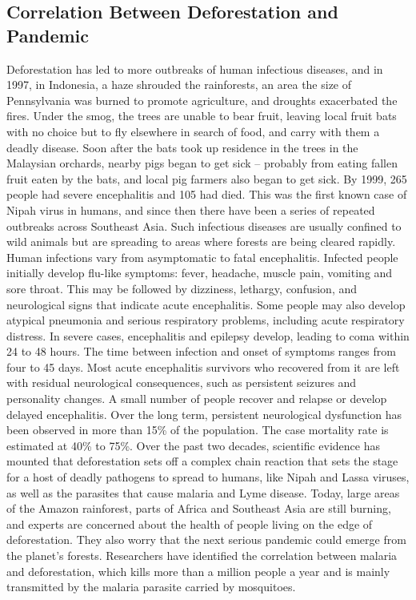 \documentclass{book}\usepackage{knitr}
\begin{document}
\begin{knitrout}
\begin{kframe}
\section{Correlation Between Deforestation and Pandemic}
Deforestation has led to more outbreaks of human infectious diseases, and in 1997, in Indonesia, a haze shrouded the rainforests, an area the size of Pennsylvania was burned to promote agriculture, and droughts exacerbated the fires. Under the smog, the trees are unable to bear fruit, leaving local fruit bats with no choice but to fly elsewhere in search of food, and carry with them a deadly disease. Soon after the bats took up residence in the trees in the Malaysian orchards, nearby pigs began to get sick -- probably from eating fallen fruit eaten by the bats, and local pig farmers also began to get sick. By 1999, 265 people had severe encephalitis and 105 had died. This was the first known case of Nipah virus in humans, and since then there have been a series of repeated outbreaks across Southeast Asia. Such infectious diseases are usually confined to wild animals but are spreading to areas where forests are being cleared rapidly. Human infections vary from asymptomatic to fatal encephalitis. Infected people initially develop flu-like symptoms: fever, headache, muscle pain, vomiting and sore throat. This may be followed by dizziness, lethargy, confusion, and neurological signs that indicate acute encephalitis. Some people may also develop atypical pneumonia and serious respiratory problems, including acute respiratory distress. In severe cases, encephalitis and epilepsy develop, leading to coma within 24 to 48 hours. The time between infection and onset of symptoms ranges from four to 45 days. Most acute encephalitis survivors who recovered from it are left with residual neurological consequences, such as persistent seizures and personality changes. A small number of people recover and relapse or develop delayed encephalitis. Over the long term, persistent neurological dysfunction has been observed in more than 15\% of the population. The case mortality rate is estimated at 40\% to 75\%. Over the past two decades, scientific evidence has mounted that deforestation sets off a complex chain reaction that sets the stage for a host of deadly pathogens to spread to humans, like Nipah and Lassa viruses, as well as the parasites that cause malaria and Lyme disease. Today, large areas of the Amazon rainforest, parts of Africa and Southeast Asia are still burning, and experts are concerned about the health of people living on the edge of deforestation. They also worry that the next serious pandemic could emerge from the planet's forests. Researchers have identified the correlation between malaria and deforestation, which kills more than a million people a year and is mainly transmitted by the malaria parasite carried by mosquitoes.


\end{kframe}
\end{knitrout}
\end{document}

